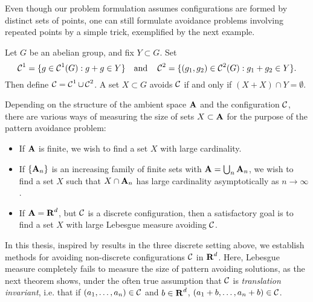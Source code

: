 
Even though our problem formulation assumes configurations are formed by distinct sets of points, one can still formulate avoidance problems involving repeated points by a simple trick, exemplified by the next example.

\begin{example}
	Let $G$ be an abelian group, and fix $Y \subset G$. Set
	\[ \operatorname{\mathcal{C}}^1 = \{ g \in \operatorname{\mathcal{C}}^1(G): g + g \in Y \} \quad \text{and} \quad \operatorname{\mathcal{C}}^2 = \{ (g_1,g_2) \in \operatorname{\mathcal{C}}^2(G): g_1 + g_2 \in Y \}. \]
	Then define $\operatorname{\mathcal{C}} = \operatorname{\mathcal{C}}^1 \cup \operatorname{\mathcal{C}}^2$. A set $X \subset G$ avoids $\operatorname{\mathcal{C}}$ if and only if $(X + X) \cap Y = \emptyset$.
\end{example}

Depending on the structure of the ambient space $\operatorname{\mathbf{A}}$ and the configuration $\operatorname{\mathcal{C}}$, there are various ways of measuring the size of sets $X \subset \operatorname{\mathbf{A}}$ for the purpose of the pattern avoidance problem:
%
\begin{itemize}
	\item If $\operatorname{\mathbf{A}}$ is finite, we wish to find a set $X$ with large cardinality.
	\item If $\{ \operatorname{\mathbf{A}}_n \}$ is an increasing family of finite sets with $\operatorname{\mathbf{A}} = \bigcup_n \operatorname{\mathbf{A}}_n$, we wish to find a set $X$ such that $X \cap \operatorname{\mathbf{A}}_n$ has large cardinality asymptotically as $n \to \infty$.
	\item If $\operatorname{\mathbf{A}} = \operatorname{\mathbf{R}}^d$, but $\operatorname{\mathcal{C}}$ is a discrete configuration, then a satisfactory goal is to find a set $X$ with large Lebesgue measure avoiding $\operatorname{\mathcal{C}}$.
\end{itemize}
%
In this thesis, inspired by results in the three discrete setting above, we establish methods for avoiding non-discrete configurations $\operatorname{\mathcal{C}}$ in $\operatorname{\mathbf{R}}^d$. Here, Lebesgue measure completely fails to measure the size of pattern avoiding solutions, as the next theorem shows, under the often true assumption that $\operatorname{\mathcal{C}}$ is \emph{translation invariant}, i.e. that if $(a_1, \dots, a_n) \in \operatorname{\mathcal{C}}$ and $b \in \operatorname{\mathbf{R}}^d$, $(a_1 + b, \dots, a_n + b) \in \operatorname{\mathcal{C}}$.

